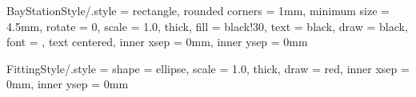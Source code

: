 \tikzset
{
	BayStationStyle/.style =
	{
		rectangle,									%
		rounded corners	= 1mm,					%
		minimum size	= 4.5mm,				%
		rotate			= 0,					%
		scale			= 1.0,					%
		thick,									%
		fill			= black!30,				%
		text			= black,				%
		draw			= black,				%
		font			= \scriptsize,				%
		text centered,							%
		inner xsep		= 0mm,					%
		inner ysep		= 0mm					%
	}
}




\tikzset
{
	FittingStyle/.style =
	{
		shape = ellipse,							%
		scale			= 1.0,					%
		thick,									%
		draw			= red,				%
		inner xsep		= 0mm,					%
		inner ysep		= 0mm					%
	}
}



